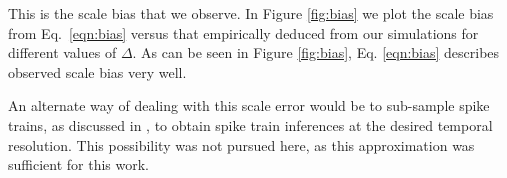 \documentclass[aoas,preprint]{imsart}
\newcommand{\w}{w}
\newcommand{\bw}{\mathbf{\w}}
\begin{document}
This is the scale bias that we observe. In Figure \ref{fig:bias} we plot the scale bias from Eq.~\ref{eqn:bias} versus that empirically deduced from our simulations for different values of $\Delta$. As can be seen in Figure \ref{fig:bias}, Eq. \ref{eqn:bias} describes observed scale bias very well.
	
An alternate way of dealing with this scale error would be to sub-sample spike trains, as discussed in \cite{Vogelstein2009}, to obtain spike train inferences at the desired temporal resolution.  This possibility was not pursued here, as this approximation was sufficient for this work.
\end{document}
